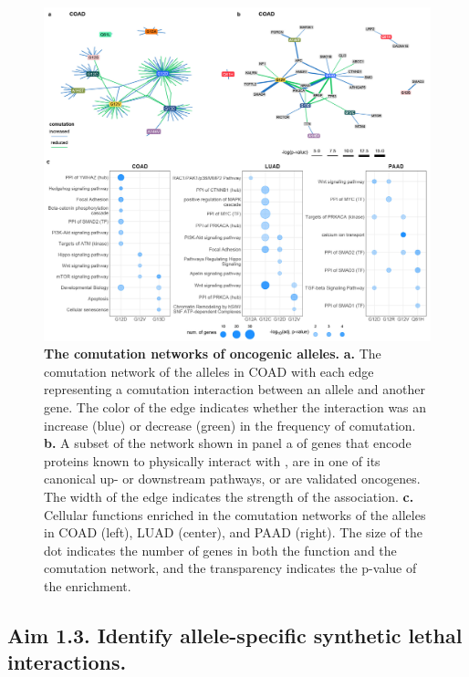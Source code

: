 \begin{figure}[t]
\centering
\includegraphics[width=180mm]{figures/aim1/Fig_3_mod_abc.jpg}
\caption{
    \textbf{The comutation networks of oncogenic \KRAS{} alleles.}
    \textbf{a.} The comutation network of the \KRAS{} alleles in COAD with each edge representing a comutation interaction between an allele and another gene. The color of the edge indicates whether the interaction was an increase (blue) or decrease (green) in the frequency of comutation.
    \textbf{b.} A subset of the network shown in panel a of genes that encode proteins known to physically interact with \kras{}, are in one of its canonical up- or downstream pathways, or are validated oncogenes. The width of the edge indicates the strength of the association.
    \textbf{c.} Cellular functions enriched in the comutation networks of the \KRAS{} alleles in COAD (left), LUAD (center), and PAAD (right). The size of the dot indicates the number of genes in both the function and the comutation network, and the transparency indicates the p-value of the enrichment.
}
\label{fig:comutation-networks}
\end{figure}



\subsection*{Aim 1.3. Identify \KRAS{} allele-specific synthetic lethal interactions.}


